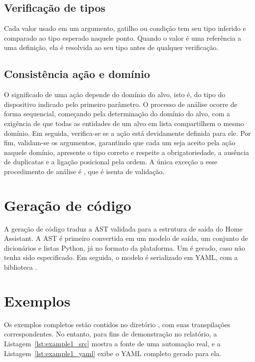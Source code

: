 \documentclass[12pt]{article}
\renewcommand\texttt[1]{\svtt{\small#1}}
\begin{document}
\subsection{Verificação de tipos}

Cada valor usado em um argumento, gatilho ou condição tem seu tipo
inferido e comparado ao tipo esperado naquele ponto. Quando o
valor é uma referência a uma definição, ela é resolvida ao seu
tipo antes de qualquer verificação.

\subsection{Consistência ação e domínio}

O significado de uma ação depende do domínio do alvo, isto é, do tipo do dispositivo indicado pelo primeiro parâmetro. O processo de análise ocorre de forma sequencial, começando pela determinação do domínio do alvo, com a exigência de que todas as entidades de um alvo em lista compartilhem o mesmo domínio. Em seguida, verifica-se se a ação está devidamente definida para ele. Por fim, validam-se os argumentos, garantindo que cada um seja aceito pela ação naquele domínio, apresente o tipo correto e respeite a obrigatoriedade, a ausência de duplicatas e a ligação posicional pela ordem. A única exceção a esse procedimento de análise é \texttt{call(...)}, que é isenta de validação.


\section{Geração de código}

A geração de código traduz a AST validada para a estrutura de saída do
Home Assistant. A AST é primeiro convertida
em um modelo de saída, um conjunto de dicionários e listas
Python, já no formato da plataforma. Um \texttt{id} é gerado, caso não tenha sido especificado. Em seguida, o modelo é
serializado em YAML, com a biblioteca \texttt{ruamel.yaml}.

\section{Exemplos}

Os exemplos completos estão contidos no diretório \href{https://github.com/jaimeadf-ufsm/elc408-compiladores/tree/main/trabalhos/t1/samples}{\texttt{samples}}, com suas transpilações correspondentes. No entanto, para fins de demonstração no relatório, a Listagem~\ref{lst:example1_src} mostra a fonte de uma automação real, e a Listagem~\ref{lst:example1_yaml} exibe o YAML completo gerado para ela.
\end{document}
